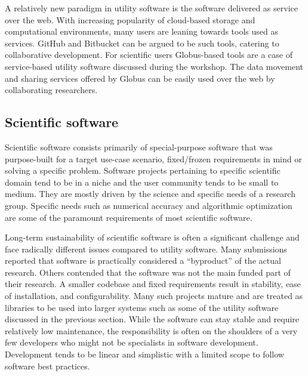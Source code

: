 \documentclass[11pt, oneside]{amsart}
\newcommand{\note}[1]{ {\textcolor{red}    { #1 }}}
\newcommand{\toolname}[1] {\textsf{#1}}
\begin{document}
A relatively new paradigm in utility software is the software delivered as
service over the web. With increasing popularity of cloud-based storage and
computational environments, many users are leaning towards tools used as
services. \toolname{GitHub} and \toolname{Bitbucket} can be argued to be
such tools, catering to collaborative development. For scientific users
\toolname{Globus}-based tools are a case of service-based utility software
discussed during the workshop. The data movement and sharing services offered
by Globus can be easily used over the web by collaborating researchers.
%
%
%
%

\subsection{Scientific software}
Scientific software consists primarily of special-purpose software that was
purpose-built for a target use-case scenario,  fixed/frozen requirements in
mind or solving a specific problem. Software projects pertaining to specific
scientific domain tend to be in a niche and the user community tends to be
small to medium. They are mostly driven by the science and specific needs of a
research group. Specific needs such as numerical accuracy and
algorithmic optimization are some of the paramount requirements of most
scientific software.

Long-term sustainability of scientific software is often a significant
challenge and face radically different issues compared to utility software.
Many submissions reported that software is practically considered a ``byproduct''
of the actual research. Others contended that the software was not the main
funded part of their research. A smaller codebase and fixed requirements result
in stability, ease of installation, and configurability.  Many such projects
mature and are treated as libraries to be used into larger systems such as some
of the utility software discussed in the previous section. While the software
can stay stable and require relatively low maintenance, the responsibility is
often on the shoulders of a very few developers who might not be specialists in
software development. Development tends to be linear and simplistic with a
limited scope to follow software best practices.
\end{document}
